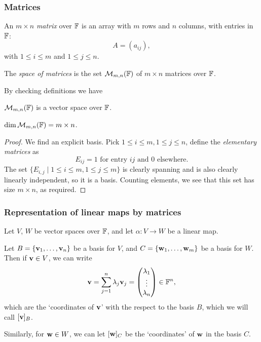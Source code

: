 \documentclass[a4paper]{article}
\begin{document}
\subsubsection*{Matrices}
\begin{definition}[Matrix]
    An $m \times n$ \emph{matrix} over ${\mathbb{F}}$ is an array with $m$ rows and $n$ columns, with entries in ${\mathbb{F}}$:
    $$
    A = (a_{ij}),
    $$
    with $1 \leq i \leq m$ and $1 \leq j \leq n$.

    The \textit{space of matrices} is the set $\mathcal{M}_{m,n}({\mathbb{F}})$ of $m \times n$ matrices over ${\mathbb{F}}$.
\end{definition}
By checking definitions we have
\begin{proposition}
    $ {\mathcal{M}}_{m,n}({\mathbb{F}}) $ is a vector space over $ {\mathbb{F}} $.
\end{proposition}
\begin{proposition}
    $ \dim {\mathcal{M}}_{m,n}({\mathbb{F}}) =m \times n$.
\end{proposition}
\begin{proof}
    We find an explicit basis. Pick $ 1\le i\le m,1\le j\le n $, define the \textit{elementary matrices} as
    \[
        E_{ij}=1 \text{ for entry } ij \text{ and } 0 \text{ elsewhere}.
    \]
    The set $\{E_{i, j} \mid 1 \leq i \leq m, 1 \leq j \leq m\}$ is clearly spanning and is also clearly linearly independent, so it is a basis. Counting elements, we see that this set has size $m \times n$, as required.
\end{proof}
\subsubsection*{Representation of linear maps by matrices}
Let $V$, $W$ be vector spaces over ${\mathbb{F}}$, and let $\alpha: V \rightarrow W$ be a linear map. 

Let $B = \{{\bf v}_1, \dots, {\bf v}_n\}$ be a basis for $V$, and $C = \{{\bf w}_1, \dots, {\bf w}_m\}$ be a basis for $W$. Then if ${\bf v} \in V$, we can write
$$
{\bf v} = \sum_{j = 1}^n \lambda_j {\bf v}_j = \begin{pmatrix}
    \lambda_1 \\ \vdots \\ \lambda_n
\end{pmatrix} \in {\mathbb{F}}^n,
$$
which are the `coordinates of ${\bf v}$' with the respect to the basis $B$, which we will call $[{\bf v}]_B$.

Similarly, for ${\bf w} \in W$, we can let $[{\bf w}]_C$ be the `coordinates' of ${\bf w}$ in the basis $C$.
\end{document}
